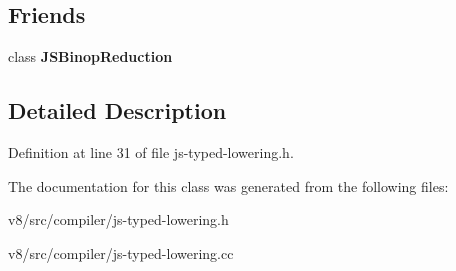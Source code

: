 \subsection*{Friends}
\begin{DoxyCompactItemize}
\item 
\mbox{\label{classv8_1_1internal_1_1compiler_1_1JSTypedLowering_a7aad168635be7ec79eefeb524967418d}} 
class {\bfseries J\+S\+Binop\+Reduction}
\end{DoxyCompactItemize}


\subsection{Detailed Description}


Definition at line 31 of file js-\/typed-\/lowering.\+h.



The documentation for this class was generated from the following files\+:\begin{DoxyCompactItemize}
\item 
v8/src/compiler/js-\/typed-\/lowering.\+h\item 
v8/src/compiler/js-\/typed-\/lowering.\+cc\end{DoxyCompactItemize}
